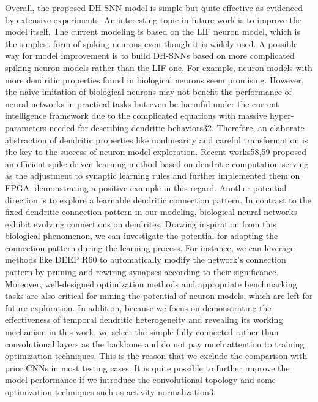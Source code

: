 Overall, the proposed DH-SNN model is simple but quite effective as evidenced by extensive experiments. An interesting topic in future work is to improve the model itself. The current modeling is based on the LIF neuron model, which is the simplest form of spiking neurons even though it is widely used. A possible way for model improvement is to build DH-SNNs based on more complicated spiking neuron models rather than the LIF one. For example, neuron models with more dendritic properties found in biological neurons seem promising. However, the naive imitation of biological neurons may not benefit the performance of neural networks in practical tasks but even be harmful under the current intelligence framework due to the complicated equations with massive hyper-parameters needed for describing dendritic behaviors32. Therefore, an elaborate abstraction of dendritic properties like nonlinearity and careful transformation is the key to the success of neuron model exploration. Recent works58,59 proposed an efficient spike-driven learning method based on dendritic computation serving as the adjustment to synaptic learning rules and further implemented them on FPGA, demonstrating a positive example in this regard. Another potential direction is to explore a learnable dendritic connection pattern. In contrast to the fixed dendritic connection pattern in our modeling, biological neural networks exhibit evolving connections on dendrites. Drawing inspiration from this biological phenomenon, we can investigate the potential for adapting the connection pattern during the learning process. For instance, we can leverage methods like DEEP R60 to automatically modify the network’s connection pattern by pruning and rewiring synapses according to their significance. Moreover, well-designed optimization methods and appropriate benchmarking tasks are also critical for mining the potential of neuron models, which are left for future exploration. In addition, because we focus on demonstrating the effectiveness of temporal dendritic heterogeneity and revealing its working mechanism in this work, we select the simple fully-connected rather than convolutional layers as the backbone and do not pay much attention to training optimization techniques. This is the reason that we exclude the comparison with prior CNNs in most testing cases. It is quite possible to further improve the model performance if we introduce the convolutional topology and some optimization techniques such as activity normalization3.


